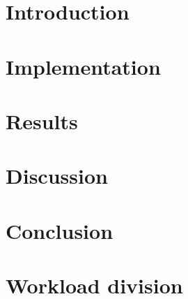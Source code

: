 \documentclass[twoside]{article}
\begin{document}
\begin{multicols}{2} %
\section{Introduction}
\label{sec:intro}


\section{Implementation}
\label{sec:implementation}


\section{Results}
\label{sec:results}


\section{Discussion}
\label{sec:discussion}


\section{Conclusion}
\label{sec:conclusion}


\section{Workload division}
\label{sec:workload}


%
%


\end{multicols}
\clearpage
\end{document}
